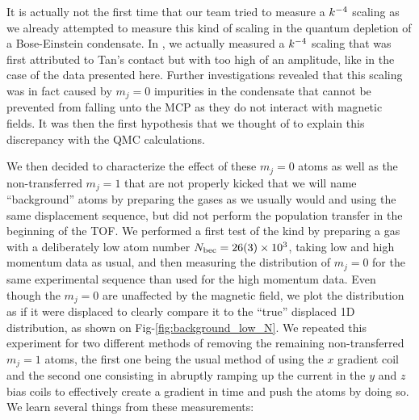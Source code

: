 It is actually not the first time that our team tried to measure a $k^{-4}$ scaling as we already attempted to measure this kind of scaling in the quantum depletion of a Bose-Einstein condensate. In \cite{chang2016momentum}, we actually measured a $k^{-4}$ scaling that was first attributed to Tan's contact but with too high of an amplitude, like in the case of the data presented here. Further investigations \cite{cayla_these} revealed that this scaling was in fact caused by $m_j=0$ impurities in the condensate that cannot be prevented from falling unto the MCP as they do not interact with magnetic fields. It was then the first hypothesis that we thought of to explain this discrepancy with the QMC calculations.

We then decided to characterize the effect of these $m_j=0$ atoms as well as the non-transferred $m_j=1$ that are not properly kicked that we will name ``background'' atoms by preparing the gases as we usually would and using the same displacement sequence, but did not perform the population transfer in the beginning of the TOF. We performed a first test of the kind by preparing a gas with a deliberately low atom number $N_{\rm{bec}}=26(3) \times 10^3$, taking low and high momentum data as usual, and then measuring the distribution of $m_j=0$ for the same experimental sequence than used for the high momentum data. Even though the $m_j=0$ are unaffected by the magnetic field, we plot the distribution as if it were displaced to clearly compare it to the ``true'' displaced 1D distribution, as shown on Fig-\ref{fig:background_low_N}. We repeated this experiment for two different methods of removing the remaining non-transferred $m_j=1$ atoms, the first one being the usual method of using the $x$ gradient coil and the second one consisting in abruptly ramping up the current in the $y$ and $z$ bias coils to effectively create a gradient in time and push the atoms by doing so. We learn several things from these measurements:

